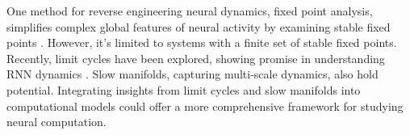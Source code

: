 \documentclass[12pt,letterpaper, onecolumn]{article}
\theoremstyle{definition}
\theoremstyle{remark}
\begin{document}
One method for reverse engineering neural dynamics, fixed point analysis, simplifies complex global features of neural activity by examining stable fixed points \citep{sussillo2014}. However, it's limited to systems with a finite set of stable fixed points. Recently, limit cycles have been explored, showing promise in understanding RNN dynamics \citep{pals2014}. Slow manifolds, capturing multi-scale dynamics, also hold potential. Integrating insights from limit cycles and slow manifolds into computational models could offer a more comprehensive framework for studying neural computation.



%
%
%
\end{document}
